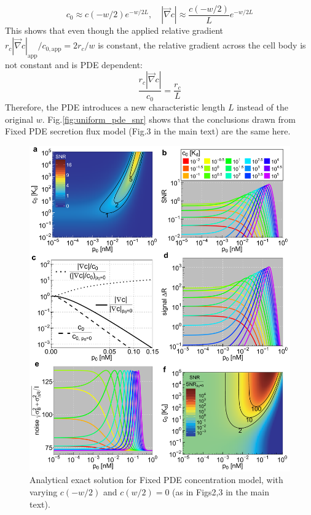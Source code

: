 \documentclass[10pt]{article}
\begin{document}
\begin{equation}
	c_0 \approx c(-w/2)e^{-w/2L},\quad |\vec{\nabla}c| \approx \frac{c(-w/2)}{L} e^{-w/2L}
\end{equation}
This shows that even though the applied relative gradient $r_c|\vec{\nabla}c|_{\mathrm{app}}/c_{0,\mathrm{app}} = 2r_c/w$ is constant, the relative gradient across the cell body is not constant and is PDE dependent:
\begin{equation}
	\frac{r_c|\vec{\nabla}c|}{c_0} = \frac{r_c}{L}
\end{equation} 
Therefore, the PDE introduces a new characteristic length $L$ instead of the original $w$. Fig.\ref{fig:uniform_pde_snr} shows that the conclusions drawn from Fixed PDE secretion flux model (Fig.3 in the main text) are the same here.

\begin{figure}[!ht]
	\centering
	\includegraphics[scale=0.245]{../figures/si_pde_uniform_signal_noise_snr}
	\caption{
		Analytical exact solution for Fixed PDE concentration model, with varying $c(-w/2)$ and $c(w/2)=0$ (as in Figs2,3 in the main text). 
}
\end{figure}
\end{document}
